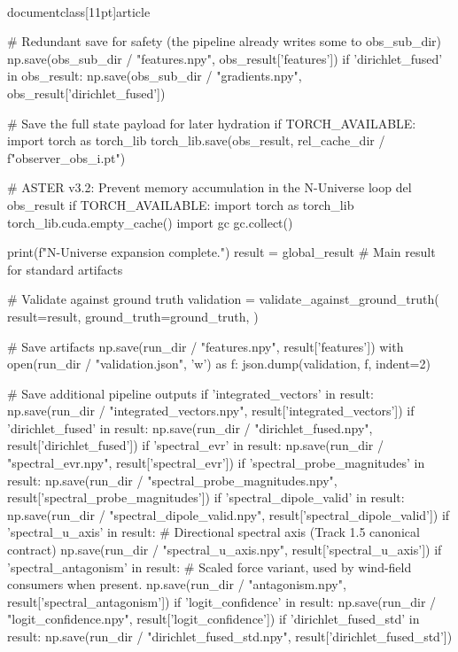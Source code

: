 \\documentclass[11pt]{article}
\begin{document}
\begin{CodeBlock}
                    # Redundant save for safety (the pipeline already writes some to obs_sub_dir)
                    np.save(obs_sub_dir / "features.npy", obs_result['features'])
                    if 'dirichlet_fused' in obs_result:
                         np.save(obs_sub_dir / "gradients.npy", obs_result['dirichlet_fused'])
                    
                    # Save the full state payload for later hydration
                    if TORCH_AVAILABLE:
                        import torch as torch_lib
                        torch_lib.save(obs_result, rel_cache_dir / f"observer_{obs_i}.pt")
                    
                    # ASTER v3.2: Prevent memory accumulation in the N-Universe loop
                    del obs_result
                    if TORCH_AVAILABLE:
                        import torch as torch_lib
                        torch_lib.cuda.empty_cache()
                    import gc
                    gc.collect()

                print(f"\n    [OK] N-Universe expansion complete.")
                result = global_result  # Main result for standard artifacts

                # Validate against ground truth
                validation = validate_against_ground_truth(
                    result=result,
                    ground_truth=ground_truth,
                )

                # Save artifacts
                np.save(run_dir / "features.npy", result['features'])
                with open(run_dir / "validation.json", 'w') as f:
                    json.dump(validation, f, indent=2)

                # Save additional pipeline outputs
                if 'integrated_vectors' in result:
                    np.save(run_dir / "integrated_vectors.npy", result['integrated_vectors'])
                if 'dirichlet_fused' in result:
                    np.save(run_dir / "dirichlet_fused.npy", result['dirichlet_fused'])
                if 'spectral_evr' in result:
                    np.save(run_dir / "spectral_evr.npy", result['spectral_evr'])
                if 'spectral_probe_magnitudes' in result:
                    np.save(run_dir / "spectral_probe_magnitudes.npy", result['spectral_probe_magnitudes'])
                if 'spectral_dipole_valid' in result:
                    np.save(run_dir / "spectral_dipole_valid.npy", result['spectral_dipole_valid'])
                if 'spectral_u_axis' in result:
                    # Directional spectral axis (Track 1.5 canonical contract)
                    np.save(run_dir / "spectral_u_axis.npy", result['spectral_u_axis'])
                if 'spectral_antagonism' in result:
                    # Scaled force variant, used by wind-field consumers when present.
                    np.save(run_dir / "antagonism.npy", result['spectral_antagonism'])
                if 'logit_confidence' in result:
                    np.save(run_dir / "logit_confidence.npy", result['logit_confidence'])
                if 'dirichlet_fused_std' in result:
                    np.save(run_dir / "dirichlet_fused_std.npy", result['dirichlet_fused_std'])


\end{CodeBlock}
\end{document}
